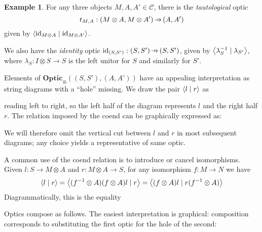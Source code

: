 \documentclass[11pt,letterpaper]{article}
\theoremstyle{plain}
\theoremstyle{definition}
\newtheorem{example}[theorem]{Example}
\newcommand{\C}{\mathscr{C}}
\newcommand{\Optic}{\mathbf{Optic}}
\newcommand{\id}{\mathrm{id}}
\newcommand{\rep}[2]{{\ensuremath \left\langle #1 \mid #2 \right\rangle}}
\newcommand{\hto}{\ensuremath{\,\mathaccent\shortmid\rightarrow\,}}
\begin{document}
\begin{example}
  For any three objects $M, A, A' \in \C$, there is the \emph{tautological} optic \[t_{M,A} : (M \otimes A, M \otimes A') \hto (A, A')\] given by $\rep{\id_{M \otimes A}}{\id_{M \otimes A'}}$.
  
  We also have the \emph{identity} optic $\id_{(S, S')} : (S, S') \hto (S, S')$, given by $\rep{\lambda^{-1}_S}{\lambda_{S'}}$, where $\lambda_S : I \otimes S \to S$ is the left unitor for $S$ and similarly for $S'$.
\end{example}

  Elements of $\Optic_\otimes((S, S'), (A, A'))$ have an appealing
  interpretation as string diagrams with a ``hole'' missing. We draw the
  pair $\rep{l}{r}$ as
  \begin{center}
    
  \end{center}
  reading left to right, so the left half of the diagram represents $l$ and the right half $r$. The relation imposed by the coend can be graphically expressed as:
  \begin{center}
    
    \qquad
    
  \end{center}
  We will therefore omit the vertical cut between $l$ and $r$ in most subsequent diagrams; any choice yields a representative of same optic.

A common use of the coend relation is to introduce or cancel isomorphisms. Given $l : S \to M \otimes A$ and $r : M \otimes A \to S$, for any isomorphism $f : M \to N$ we have
\begin{align*}
\rep{l}{r} = \rep{(f^{-1} \otimes A)(f \otimes A)l}{r} = \rep{(f \otimes A)l}{r(f^{-1} \otimes A)}
\end{align*}
Diagrammatically, this is the equality
  \begin{center}
    
    \qquad \raisebox{1.5cm}{$=$} \qquad
    
  \end{center}

Optics compose as follows. The easiest interpretation is graphical: composition corresponds to substituting the first optic for the hole of the second:
\begin{center}
  
  \quad\raisebox{1.5cm}{$\circ$}\qquad
   \\
  \raisebox{1.5cm}{$:=$}\qquad
  
\end{center}
\end{document}
